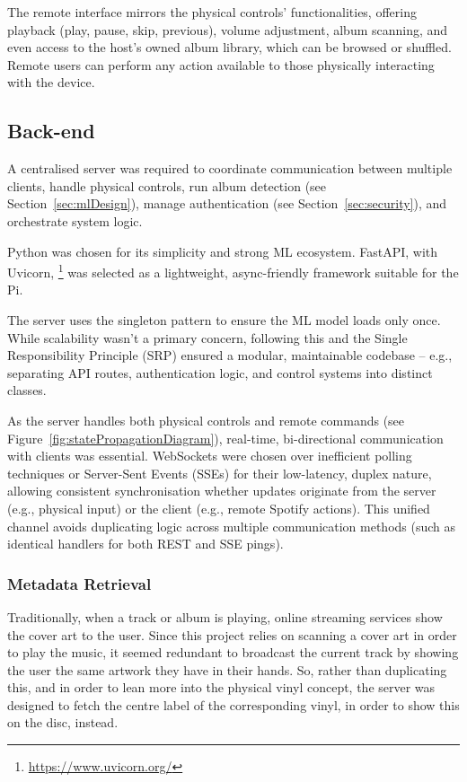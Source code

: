                 The remote interface mirrors the physical controls' functionalities, offering playback (play, pause, skip, previous), volume adjustment, album scanning, and even access to the host's owned album library, which can be browsed or shuffled. Remote users can perform any action available to those physically interacting with the device.
    
        
        \subsection{Back-end}
    
            A centralised server was required to coordinate communication between multiple clients, handle physical controls, run album detection (see Section~\ref{sec:mlDesign}), manage authentication (see Section~\ref{sec:security}), and orchestrate system logic.
    
            Python was chosen for its simplicity and strong ML ecosystem. FastAPI, with Uvicorn, \footnote{\url{https://www.uvicorn.org/}} was selected as a lightweight, async-friendly framework suitable for the Pi.
    
            The server uses the singleton pattern to ensure the ML model loads only once. While scalability wasn't a primary concern, following this and the Single Responsibility Principle (SRP) ensured a modular, maintainable codebase -- e.g., separating API routes, authentication logic, and control systems into distinct classes.
    
            As the server handles both physical controls and remote commands (see Figure~\ref{fig:statePropagationDiagram}), real-time, bi-directional communication with clients was essential. WebSockets were chosen over inefficient polling techniques or Server-Sent Events (SSEs) for their low-latency, duplex nature, allowing consistent synchronisation whether updates originate from the server (e.g., physical input) or the client (e.g., remote Spotify actions). This unified channel avoids duplicating logic across multiple communication methods (such as identical handlers for both REST and SSE pings).
        
            \subsubsection{Metadata Retrieval}
    
                Traditionally, when a track or album is playing, online streaming services show the cover art to the user. Since this project relies on scanning a cover art in order to play the music, it seemed redundant to broadcast the current track by showing the user the same artwork they have in their hands. So, rather than duplicating this, and in order to lean more into the physical vinyl concept, the server was designed to fetch the centre label of the corresponding vinyl, in order to show this on the disc, instead.
    
